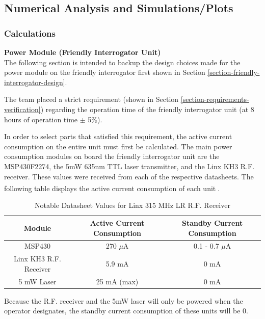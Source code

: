 \documentclass[letterpaper,10pt]{article}
\begin{document}
\begin{spacing}{1.15}
\subsection{Numerical Analysis and Simulations/Plots} \label{section-simulations-calculations}
\subsubsection{Calculations}
\normalsize\textbf{Power Module (Friendly Interrogator Unit)} \\
The following section is intended to backup the design choices made for the power module on the friendly interrogator first shown in Section \ref{section-friendly-interrogator-design}.

The team placed a strict requirement (shown in Section \ref{section-requirements-verification}) regarding the operation time of the friendly interrogator unit (at 8 hours of operation time $\pm$ 5\%).

In order to select parts that satisfied this requirement, the active current consumption on the entire unit must first be calculated. The main power consumption modules on board the friendly interrogator unit are the MSP430F2274, the 5mW 635nm TTL laser transmitter, and the Linx KH3 R.F. receiver. These values were received from each of the respective datasheets. The following table displays the active current consumption of each unit\textsuperscript{\cite{MSP430F2274} \cite{Linx-Receiver} \cite{Laser}}. 


\begin{table}[htbp]
	\centering
	\begin{tabular}{c|c|c}	%
		\toprule	%
		Module & Active Current Consumption & Standby Current Consumption\\
		\midrule
		MSP430 & 270 $\mu$A & 0.1 - 0.7 $\mu$A\\ 
		Linx KH3 R.F. Receiver & 5.9 mA & 0 mA\\
		5 mW Laser & 25 mA (max) & 0 mA \\
	\bottomrule	%
	\end{tabular}%
	\caption{Notable Datasheet Values for Linx 315 MHz LR R.F. Receiver}
	\label{tab:table2}	%
\end{table}%

Because the R.F. receiver and the 5mW laser will only be powered when the operator designates, the standby current consumption of these units will be 0.


\end{spacing}
\end{document}
